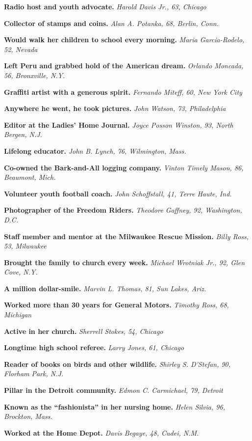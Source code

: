 \textbf{Radio host and youth advocate.} \emph{Harold Davis Jr., 63,
Chicago}

\textbf{Collector of stamps and coins.} \emph{Alan A. Potanka, 68,
Berlin, Conn.}

\textbf{Would walk her children to school every morning.} \emph{Maria
Garcia-Rodelo, 52, Nevada}

\textbf{Left Peru and grabbed hold of the American dream.} \emph{Orlando
Moncada, 56, Bronxville, N.Y.}

\textbf{Graffiti artist with a generous spirit.} \emph{Fernando Miteff,
60, New York City}

\textbf{Anywhere he went, he took pictures.} \emph{John Watson, 73,
Philadelphia}

\textbf{Editor at the Ladies' Home Journal.} \emph{Joyce Posson Winston,
93, North Bergen, N.J.}

\textbf{Lifelong educator.} \emph{John B. Lynch, 76, Wilmington, Mass.}

\textbf{Co-owned the Bark-and-All logging company.} \emph{Vinton Timely
Mason, 86, Beaumont, Mich.}

\textbf{Volunteer youth football coach.} \emph{John Schoffstall, 41,
Terre Haute, Ind.}

\textbf{Photographer of the Freedom Riders.} \emph{Theodore Gaffney, 92,
Washington, D.C.}

\textbf{Staff member and mentor at the Milwaukee Rescue Mission.}
\emph{Billy Ross, 53, Milwaukee}

\textbf{Brought the family to church every week.} \emph{Michael Wrotniak
Jr., 92, Glen Cove, N.Y.}

\textbf{A million dollar-smile.} \emph{Marvin L. Thomas, 81, Sun Lakes,
Ariz.}

\textbf{Worked more than 30 years for General Motors.} \emph{Timothy
Ross, 68, Michigan}

\textbf{Active in her church.} \emph{Sherrell Stokes, 54, Chicago}

\textbf{Longtime high school referee.} \emph{Larry Jones, 61, Chicago}

\textbf{Reader of books on birds and other wildlife.} \emph{Shirley S.
D'Stefan, 90, Florham Park, N.J.}

\textbf{Pillar in the Detroit community.} \emph{Edmon C. Carmichael, 79,
Detroit}

\textbf{Known as the ``fashionista'' in her nursing home.} \emph{Helen
Silvia, 96, Brockton, Mass.}

\textbf{Worked at the Home Depot.} \emph{Davis Begaye, 48, Cudei, N.M.}

